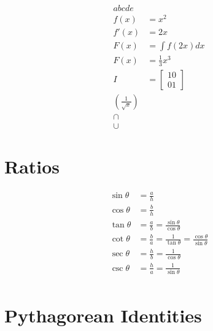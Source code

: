 \documentclass{article}
\begin{document}
        \begin{align}
                abcde\\
                f(x) &= x^2\\
                f'(x) &= 2x\\
                F(x) &= \int f(2x)dx\\
                F(x) &= \frac{1}{3}x^3\\
                I &=    \begin{bmatrix}
                                1 0\\
                                0 1
                        \end{bmatrix}\\
                \left(\frac{1}{\sqrt{x}}\right)\\
                \cap\\
                \cup
        \end{align}

        \section{Ratios}


        \begin{align}
                \sin \theta &= \frac{a}{h}\\
                \cos \theta &= \frac{b}{h}\\
                \tan \theta &= \frac{a}{b} = \frac{\sin \theta}{\cos \theta}\\
                \cot \theta &= \frac{b}{a} = \frac{1}{\tan \theta} = \frac{\cos \theta}{\sin \theta}\\
                \sec \theta &= \frac{h}{b} = \frac{1}{\cos \theta}\\
                \csc \theta &= \frac{h}{a} = \frac{1}{\sin \theta}\\
        \end{align}

        \section{Pythagorean Identities}
\end{document}
